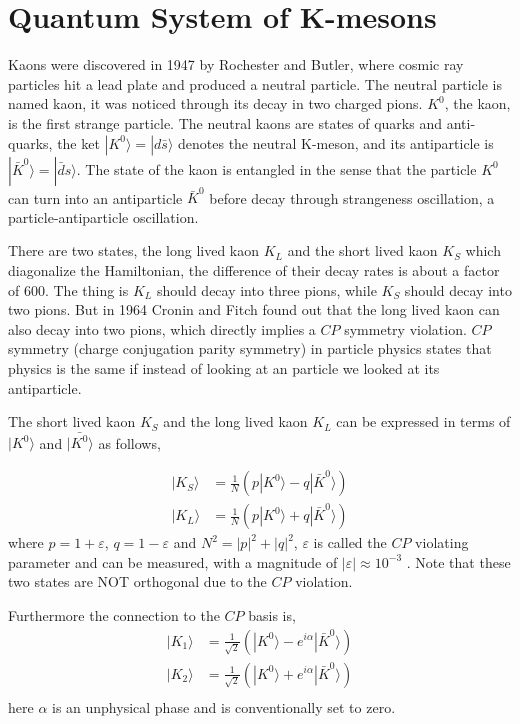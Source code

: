 \documentclass[a4paper]{article}
\begin{document}
\section{Quantum System of K-mesons}
Kaons were discovered in 1947 by Rochester and Butler, where cosmic ray
particles hit a lead plate and produced a neutral particle. The neutral
particle is named kaon, it was noticed through its decay in two charged
pions. $K^0$, the kaon, is the first strange particle.
The neutral kaons are states of quarks and anti-quarks, the ket
$|K^0\rangle = |d\bar{s}\rangle$ denotes the neutral K-meson, and its
antiparticle is $|\bar{K}^0\rangle = |\bar{d}s\rangle$. The state of the kaon
is entangled in the sense that the particle $K^0$ can turn into an antiparticle
$\bar{K}^0$ before decay through strangeness oscillation, a particle-antiparticle oscillation.


There are two states, the long lived kaon $K_L$ and the short lived kaon $K_S$
which diagonalize the Hamiltonian,
the difference of their decay rates is about a factor of $600$.
The thing is $K_L$ should decay into three pions, while $K_S$ should decay
into two pions. But in 1964 Cronin and Fitch found out that the long lived
kaon can also decay into two pions, which directly implies a $CP$ symmetry violation.
$CP$ symmetry (charge conjugation parity symmetry) in particle physics states
that physics is the same if instead of looking at an particle we looked at its
antiparticle.

The short lived kaon $K_S$ and the long lived kaon $K_L$ can be expressed in
terms of $|K^0\rangle$ and $|\bar{K^0}\rangle$ as follows,

\begin{align}
    |K_S\rangle &=  \frac{1}{N}(p|K^0\rangle - q|\bar{K}^0\rangle) \\
    |K_L\rangle &=  \frac{1}{N}(p|K^0\rangle + q|\bar{K}^0\rangle)
\end{align}
where $p = 1+\varepsilon$, $q=1-\varepsilon$ and $N^2 = |p|^2 + |q|^2$,
$\varepsilon$ is called the $CP$ violating parameter and can be measured, with
a magnitude of $|\varepsilon| \approx 10^{-3}$ \cite{Bertlmann} . Note
that these two states are NOT orthogonal due to the $CP$ violation.


Furthermore the connection to the $CP$ basis is,
\begin{align}
    |K_1\rangle &=  \frac{1}{\sqrt{2}}(|K^0\rangle - e^{i\alpha}|\bar{K}^0\rangle) \\
    |K_2\rangle &=  \frac{1}{\sqrt{2}}(|K^0\rangle + e^{i\alpha}|\bar{K}^0\rangle) \\
\end{align}
here $\alpha$ is an unphysical phase and is conventionally set to zero.
\end{document}
